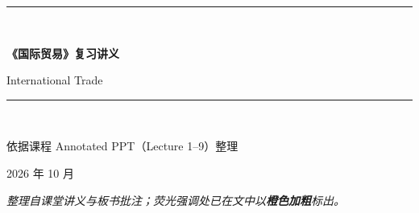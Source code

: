 \documentclass[11pt]{ctexart}
\newcommand{\kw}[1]{\textbf{\textcolor{hlorange}{#1}}}      %
\begin{document}
\begin{titlepage}
\centering
\vspace*{2.5cm}
{\color{mainblue}\rule{\linewidth}{2pt}}\\[1.2em]
{\Huge\bfseries\color{mainblue} 《国际贸易》复习讲义\par}
\vspace{0.8em}
{\Large\color{mainblue!75} International Trade\par}
\vspace{0.5em}
{\color{mainblue}\rule{\linewidth}{1pt}}\\[2em]
{\large 依据课程 Annotated PPT（Lecture 1--9）整理\par
\vspace{0.5em}
2026 年 10 月\par}
\vfill
{\color{mainblue!60}\itshape 整理自课堂讲义与板书批注；荧光强调处已在文中以\kw{橙色加粗}标出。\par}
\vspace*{2cm}
\end{titlepage}

\tableofcontents

\newpage









\end{document}
